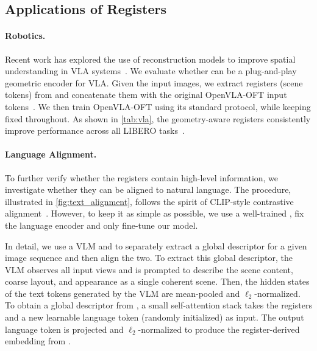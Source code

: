 \subsection{Applications of Registers}%
\label{sec:applications}

\paragraph{Robotics.} Recent work has explored the use of reconstruction models to improve spatial understanding in VLA systems~\cite{li25spatial, abouzeid25geoaware-vla:}.
We evaluate whether \method can be a plug-and-play geometric encoder for VLA\@.
Given the input images, we extract registers (scene tokens) from \method and concatenate them with the original OpenVLA-OFT input tokens~\cite{kim25fine-tuning}.
We then train OpenVLA-OFT using its standard protocol, while keeping \method fixed throughout.
As shown in \cref{tab:vla}, the geometry-aware registers consistently improve performance across all LIBERO tasks~\cite{liu23libero:}.



\paragraph{Language Alignment.}

To further verify whether the registers contain high-level information, we investigate whether they can be aligned to natural language.
The procedure, illustrated in \cref{fig:text_alignment}, follows the spirit of CLIP-style contrastive alignment~\cite{radford21learning, zhai23sigmoid}.
However, to keep it as simple as possible, we use a well-trained \method, fix the language encoder and only fine-tune our model.



In detail, we use a VLM and \method to separately extract a global descriptor for a given image sequence and then align the two.
To extract this global descriptor, the VLM observes all input views and is prompted to describe the scene content, coarse layout, and appearance as a single coherent scene.
Then, the hidden states of the text tokens generated by the VLM are mean-pooled and $\ell_2$-normalized.
To obtain a global descriptor from \method, a small self-attention stack takes the registers and a new learnable language token (randomly initialized) as input.
The output language token is projected and $\ell_2$-normalized to produce the register-derived embedding from \method.

